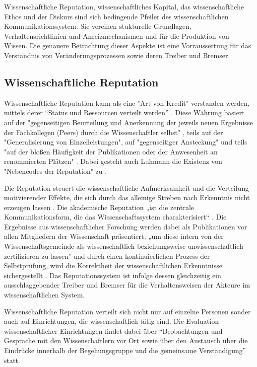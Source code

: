 Wissenschaftliche Reputation, wissenschaftliches Kapital, das wissenschaftliche Ethos und der Diskurs sind sich bedingende Pfeiler des wissenschaftlichen Kommunikationssystem. Sie vereinen stukturelle Grundlagen, Verhaltensrichtlinien und Anreizmechanismen und für die Produktion von Wissen. Die genauere Betrachtung dieser Aspekte ist eine Vorraussertung für das Verständnis von Veränderungsprozessen sowie deren Treiber und Bremser.

\subsection{Wissenschaftliche Reputation}

Wissenschaftliche Reputation kann als eine "Art von Kredit" \cite{luhmann_1970_selbststeuerung} verstanden werden, mittels derer “Status und Ressourcen verteilt werden” \cite{hanekop_2006}. Diese Währung basiert auf der "gegenseitigen Beurteilung und Anerkennung der jeweils neuen Ergebnisse der Fachkollegen (Peers) durch die Wissenschaftler selbst" \cite{Hanekop_2014} \cite{suchen_Hornbostel_2006}, teils auf der "Generalisierung von Einzelleistungen", auf "gegenseitiger Ansteckung" und teils "auf der bloßen Häufigkeit der Publikationen oder der Anwesenheit an renommierten Plätzen" \cite{luhmann_1970_selbststeuerung}. Dabei gesteht auch Luhmann die Existenz von "Nebencodes der Reputation" zu \cite{schmoch_2003_hochschulforschung}.

Die Reputation steuert die wissenschaftliche Aufmerksamkeit und die Verteilung motivierender Effekte, die sich durch das alleinige Streben nach Erkenntnis nicht erzeugen lassen \cite{suchen_luhmann}. Die akademische Reputation „ist die zentrale Kommunikationsform, die das Wissenschaftssystem charakterisiert“ \cite{Rutenfranz_1997}. Die Ergebnisse aus wissenschaftlicher Forschung werden dabei als Publikationen vor allen Mitgliedern der Wissenschaft präsentiert, „um diese intern von der Wissenschaftsgemeinde als wissenschaftlich beziehungsweise unwissenschaftlich zertifizieren zu lassen" \cite{Rutenfranz_1997} und durch einen kontinuierlichen Prozess der Selbstprüfung, wird die Korrektheit der wissenschaftlichen Erkenntnisse sichergestellt \cite{edsall_1976_scientific}. Das Reputationssystem ist infolge dessen gleichzeitig ein ausschlaggebender Treiber und Bremser für die Verhaltensweisen der Akteure im wissenschaftlichen System.

Wissenschaftliche Reputation verteilt sich nicht nur auf einzelne Personen sonder auch auf Einrichtungen, die wissenschaftlich tätig sind. Die Evaluation wissenschaftlicher Einrichtungen findet dabei über “Beobachtungen und Gespräche mit den Wissenschaftlern vor Ort sowie über den Austausch über die Eindrücke innerhalb der Begehungsgruppe und die gemeinsame Verständigung”\cite{Barl_sius_2008} statt.

